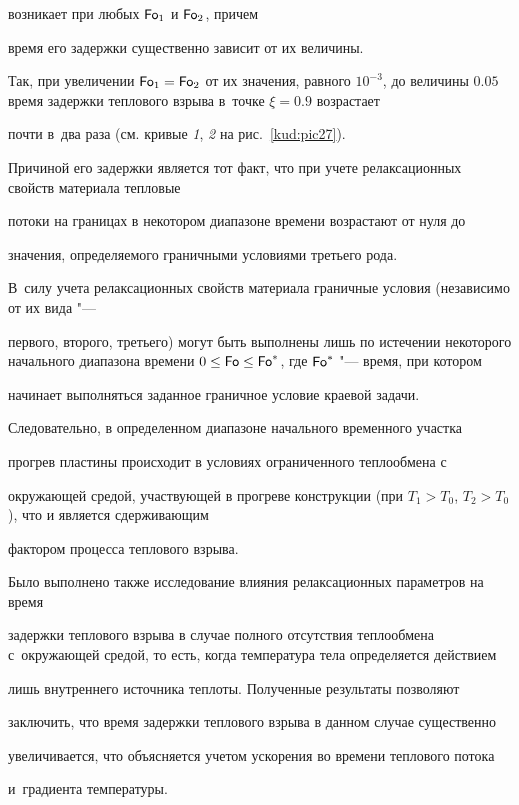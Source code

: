 возникает при любых $\operatorname{\sf Fo}_1 $ и $\operatorname{\sf Fo}_2$, причем 

время его задержки существенно зависит от их величины. 

Так, при увеличении $\operatorname{\sf Fo}_1 =\operatorname{\sf Fo}_2$ от их значения, равного $10^{-3}$, до величины $0.05$ время задержки теплового взрыва в~точке $\xi = 0.9$ возрастает

почти в~два раза (см. кривые {\sl 1}, {\sl 2} на рис.~\ref{kud:pic27}). 

Причиной его задержки является тот факт, что при учете релаксационных свойств материала тепловые

потоки на границах в некотором диапазоне времени возрастают от нуля до

значения, определяемого граничными условиями третьего рода. 

В~силу учета релаксационных свойств материала граничные условия (независимо от их вида "---

первого, второго, третьего) могут быть выполнены лишь по истечении некоторого начального диапазона времени $0\le \operatorname{\sf Fo}\le \operatorname{\sf Fo}^{\ast}$, где $\operatorname{\sf Fo}^{\ast}$ "--- время, при котором

начинает выполняться заданное граничное условие краевой задачи.

Следовательно, в определенном диапазоне начального временного участка

прогрев пластины происходит в условиях ограниченного теплообмена с

окружающей средой, участвующей в прогреве конструкции (при $T_{1}>T_0$, $T_{2}>T_0$), что и является сдерживающим

фактором процесса теплового взрыва.



Было выполнено также исследование влияния релаксационных параметров на время

задержки теплового взрыва в случае полного отсутствия теплообмена с~окружающей средой, то есть, когда температура тела определяется действием

лишь внутреннего источника теплоты. Полученные результаты позволяют

заключить, что время задержки теплового взрыва в данном случае существенно

увеличивается, что объясняется учетом ускорения во времени теплового потока

и~градиента температуры.



